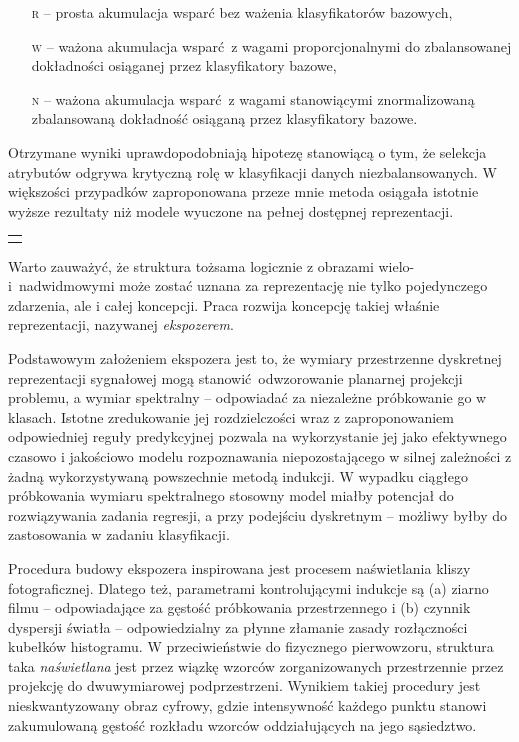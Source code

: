 \begin{itemize}
	\item[\textsc{r}] -- prosta akumulacja wsparć bez ważenia klasyfikatorów bazowych,
	\item[\textsc{w}] -- ważona akumulacja wsparć z wagami proporcjonalnymi do zbalansowanej dokładności osiąganej przez klasyfikatory bazowe,
	\item[\textsc{n}] -- ważona akumulacja wsparć z wagami stanowiącymi znormalizowaną zbalansowaną dokładność osiąganą przez klasyfikatory bazowe.
\end{itemize}

Otrzymane wyniki uprawdopodobniają hipotezę stanowiącą o tym, że selekcja atrybutów odgrywa krytyczną rolę w klasyfikacji danych niezbalansowanych. W większości przypadków zaproponowana przeze mnie metoda osiągała istotnie wyższe rezultaty niż modele wyuczone na pełnej dostępnej reprezentacji.
\vspace{1em}

{
\color{red}
\noindent\begin{tabular}{p{\textwidth}}
	\toprule &
\end{tabular}\vspace{-1em}
}
\noindent Warto zauważyć, że struktura tożsama logicznie z obrazami wielo- i~nadwidmowymi może zostać uznana za reprezentację nie tylko pojedynczego zdarzenia, ale i całej koncepcji. Praca  rozwija koncepcję takiej właśnie reprezentacji, nazywanej \emph{ekspozerem}.

Podstawowym założeniem ekspozera jest to, że wymiary przestrzenne dyskretnej reprezentacji sygnałowej mogą stanowić odwzorowanie planarnej projekcji problemu, a wymiar spektralny -- odpowiadać za niezależne próbkowanie go w klasach. Istotne zredukowanie jej rozdzielczości wraz z zaproponowaniem odpowiedniej reguły predykcyjnej pozwala na wykorzystanie jej jako efektywnego czasowo i jakościowo modelu rozpoznawania niepozostającego w silnej zależności z żadną wykorzystywaną powszechnie metodą indukcji. W wypadku ciągłego próbkowania wymiaru spektralnego stosowny model miałby potencjał do rozwiązywania zadania regresji, a przy podejściu dyskretnym -- możliwy byłby do zastosowania w zadaniu klasyfikacji.

Procedura budowy ekspozera inspirowana jest procesem naświetlania kliszy fotograficznej. Dlatego też, parametrami kontrolującymi indukcje są (a) ziarno filmu -- odpowiadające za gęstość próbkowania przestrzennego i (b) czynnik dyspersji światła -- odpowiedzialny za płynne złamanie zasady rozłączności kubełków histogramu. W przeciwieństwie do fizycznego pierwowzoru, struktura taka \emph{naświetlana} jest przez wiązkę wzorców zorganizowanych przestrzennie przez projekcję do dwuwymiarowej podprzestrzeni. Wynikiem takiej procedury jest nieskwantyzowany obraz cyfrowy, gdzie intensywność każdego punktu stanowi zakumulowaną gęstość rozkładu wzorców oddziałujących na jego sąsiedztwo.

